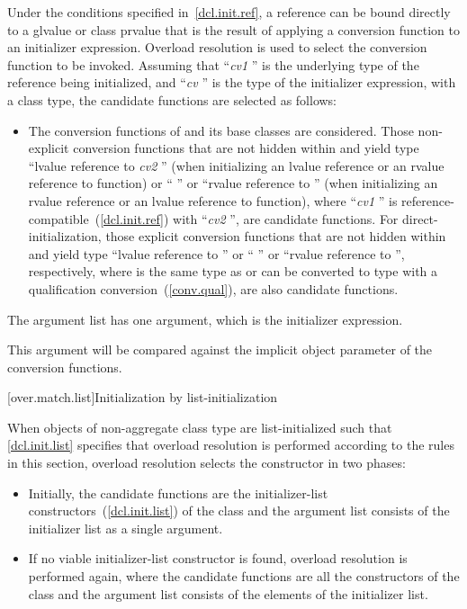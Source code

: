 \pnum
Under the conditions specified in~\ref{dcl.init.ref}, a reference can be bound directly
to a glvalue or class prvalue that is the result of applying a conversion
function to an initializer expression.
Overload resolution is used to select the
conversion function to be invoked.
Assuming that ``\textit{cv1} '' is the
underlying type of the reference being initialized, and
``\textit{cv} '' is the type
of the initializer expression, with
a class type,
the candidate functions are selected as follows:
\begin{itemize}
\item
The conversion functions of
and its base classes are considered.
Those non-explicit conversion functions that are not hidden within
and yield type ``lvalue reference to \textit{cv2} ''
(when initializing an lvalue reference or an rvalue reference to function) or
`` ''
or ``rvalue reference to  '' (when initializing an
rvalue reference or an lvalue reference to function),
where ``\textit{cv1} '' is reference-compatible~(\ref{dcl.init.ref})
with ``\textit{cv2} '',
are candidate functions. For direct-initialization, those explicit
conversion functions that are not hidden within  and yield
type ``lvalue reference to  '' or ``
'' or ``rvalue reference to  '',
respectively, where  is the same type as  or can be
converted to type  with a qualification
conversion~(\ref{conv.qual}), are also candidate functions.

\end{itemize}

\pnum
The argument list has one argument, which is the initializer expression.
\begin{note}
This argument will be compared against
the implicit object parameter of the conversion functions.
\end{note}

[over.match.list]{Initialization by list-initialization}%

\pnum
When objects of non-aggregate class type  are
list-initialized such that \ref{dcl.init.list} specifies that overload resolution
is performed according to the rules in this section, overload resolution selects the
constructor in two phases:

\begin{itemize}
\item
Initially, the candidate functions are the initializer-list constructors~(\ref{dcl.init.list})
of the class  and
the argument list consists of the initializer list as a single argument.

\item
If no viable initializer-list constructor is found, overload resolution is
performed again, where the candidate functions are all the constructors of
the class  and
the argument list consists of the elements of the initializer list.
\end{itemize}%
%

